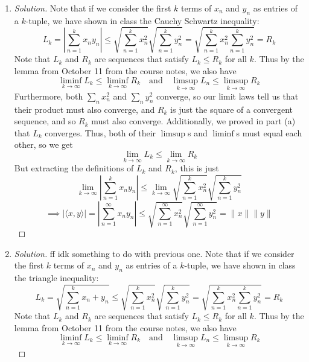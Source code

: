 \documentclass{article}
\begin{document}
\begin{enumerate}
\begin{proof}[Solution]
		Finally, by the comparison test, since $\sum_n (x_n^2 + b_n^2)$,
		we have that $\sum_n (x_ny_n)$ converges as well.
	\end{proof}
	\item \begin{proof}[Solution]\let\qed\relax
		Note that if we consider the first $k$ terms of $x_n$ and $y_n$
		as entries of a $k$-tuple,
		we have shown in class the Cauchy Schwartz inequality:
		\[
			L_k = \left\lvert\sum_{n=1}^k x_ny_n\right\rvert \leq
			\sqrt{\sum_{n=1}^k x^2_n}\sqrt{\sum_{n=1}^k y^2_n}
			= \sqrt{\sum_{n=1}^k x^2_n\sum_{n=1}^k y^2_n} = R_k
		\]
		Note that $L_k$ and $R_k$ are sequences that satisfy $L_k \leq R_k$
		for all $k$.
		Thus by the lemma from October 11 from the course notes,
		we also have
		\[
			\liminf_{k\to\infty} L_k \leq \liminf_{k\to\infty} R_k
			\quad \text{and} \quad
			\limsup_{k\to\infty}L_n \leq \limsup_{k\to\infty}R_k
		\]
		Furthermore, both $\sum_n x_n^2$ and $\sum_n y_n^2$
		converge,
		so our limit laws tell us that their product must also converge,
		and $R_k$ is just the square of a convergent sequence,
		and so $R_k$ must also converge.
		Additionally, we proved in part (a) that $L_k$ converges.
		Thus, both of their $\limsup$s and $\liminf$s
		must equal each other, so we get
		\[
			\lim_{k\to\infty} L_k \leq \lim_{k\to\infty} R_k
		\]
		But extracting the definitions of $L_k$ and $R_k$,
		this is just
		\[
			\lim_{k\to\infty} \left\lvert\sum_{n=1}^k x_ny_n\right\rvert \leq
			\lim_{k\to\infty} \sqrt{\sum_{n=1}^k x^2_n}\sqrt{\sum_{n=1}^k y^2_n}
		\]
		\[
			\implies |\langle x,y \rangle| =
			\left\lvert\sum_{n=1}^\infty x_ny_n\right\rvert \leq
			\sqrt{\sum_{n=1}^\infty x^2_n}\sqrt{\sum_{n=1}^\infty y^2_n}
			= \lVert x \rVert \lVert y \rVert
		\]
	\end{proof}
	\item \begin{proof}[Solution]\let\qed\relax
		ff idk something to do with previous one.
		Note that if we consider the first $k$ terms of $x_n$ and $y_n$
		as entries of a $k$-tuple,
		we have shown in class the triangle inequality:
		\[
			L_k = \sqrt{\sum_{n=1}^k x_n + y_n} \leq
			\sqrt{\sum_{n=1}^k x^2_n}\sqrt{\sum_{n=1}^k y^2_n}
			= \sqrt{\sum_{n=1}^k x^2_n\sum_{n=1}^k y^2_n} = R_k
		\]
		Note that $L_k$ and $R_k$ are sequences that satisfy $L_k \leq R_k$
		for all $k$.
		Thus by the lemma from October 11 from the course notes,
		we also have
		\[
			\liminf_{k\to\infty} L_k \leq \liminf_{k\to\infty} R_k
			\quad \text{and} \quad
			\limsup_{k\to\infty}L_n \leq \limsup_{k\to\infty}R_k
\]
\end{proof}
\end{enumerate}
\end{document}
